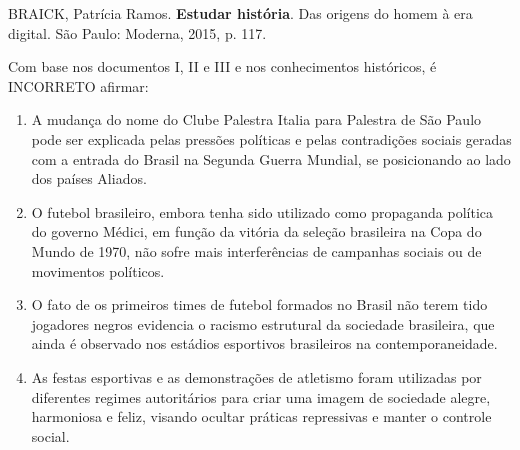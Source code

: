 \begin{center}BRAICK, Patrícia Ramos. \textbf{Estudar história}. Das origens do homem à era digital. São Paulo: Moderna, 2015, p. 117.\end{center}

Com base nos documentos I, II e III e nos conhecimentos históricos, é INCORRETO afirmar:
\begin{enumerate}
\item A mudança do nome do Clube Palestra Italia para Palestra de São Paulo pode ser explicada pelas
       pressões políticas e pelas contradições sociais geradas com a entrada do Brasil na Segunda Guerra
       Mundial, se posicionando ao lado dos países Aliados.
\item O futebol brasileiro, embora tenha sido utilizado como propaganda política do governo Médici, em função
       da vitória da seleção brasileira na Copa do Mundo de 1970, não sofre mais interferências de campanhas
       sociais ou de movimentos políticos.
\item O fato de os primeiros times de futebol formados no Brasil não terem tido jogadores negros evidencia o
       racismo estrutural da sociedade brasileira, que ainda é observado nos estádios esportivos brasileiros na
       contemporaneidade.
\item As festas esportivas e as demonstrações de atletismo foram utilizadas por diferentes regimes autoritários
       para criar uma imagem de sociedade alegre, harmoniosa e feliz, visando ocultar práticas repressivas e
       manter o controle social.
\end{enumerate}
